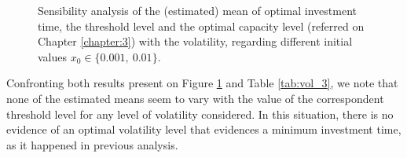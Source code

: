 \begin{figure}[!ht]
	\begin{subfigmatrix}{2}
	\end{subfigmatrix}
	\caption{Sensibility analysis of the (estimated) mean of optimal investment time, the threshold level and the optimal capacity level (referred on Chapter \ref{chapter:3}) with the volatility, regarding different initial values $x_0 \in \{0.001, \ 0.01\}$.}
	\label{fig:vol_3}
\end{figure}

Confronting both results present on Figure \ref{fig:vol_3} and Table \ref{tab:vol_3}, we note that none of the estimated means seem to vary with the value of the correspondent threshold level for any level of volatility considered. In this situation, there is no evidence of an optimal volatility level that evidences a minimum investment time, as it happened in previous analysis.


